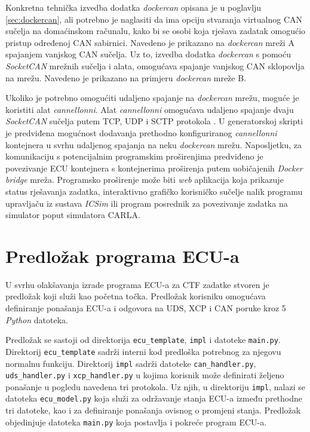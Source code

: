 \documentclass[times, utf8, diplomski, numeric]{fer}
\begin{document}
Konkretna tehnička izvedba dodatka \textit{dockercan} opisana je u poglavlju \ref{sec:dockercan}, ali potrebno je naglasiti da ima opciju stvaranja virtualnog CAN sučelja na domaćinskom računalu, kako bi se osobi koja rješava zadatak omogućio pristup određenoj CAN sabirnici. Navedeno je prikazano na \textit{dockercan} mreži A spajanjem vanjskog CAN sučelja. Uz to, izvedba dodatka \textit{dockercan} s pomoću \textit{SocketCAN} mrežnih sučelja i alata, omogućava spajanje vanjskog CAN sklopovlja na mrežu. Navedeno je prikazano na primjeru \textit{dockercan} mreže B.

Ukoliko je potrebno omogućiti udaljeno spajanje na \textit{dockercan} mrežu, moguće je koristiti alat \textit{cannellonni}. Alat \textit{cannellonni} omogućava udaljeno spajanje dvaju \textit{SocketCAN} sučelja putem TCP, UDP i SCTP protokola \cite{reinhardt2015mapping}. U generatorskoj skripti je predviđena mogućnost dodavanja prethodno konfiguriranog \textit{cannellonni} kontejnera u svrhu udaljenog spajanja na neku \textit{dockercan} mrežu.
\newpage
Naposljetku, za komunikaciju s potencijalnim programskim proširenjima predviđeno je povezivanje ECU kontejnera s kontejnerima proširenja putem uobičajenih \textit{Docker bridge} mreža. Programsko proširenje može biti \textit{web} aplikacija koja prikazuje status rješavanja zadatka, interaktivno grafičko korisničko sučelje nalik programu upravljaču iz sustava \textit{ICSim} ili program posrednik za povezivanje zadatka na simulator poput simulatora CARLA.

\section{Predložak programa ECU-a}
U svrhu olakšavanja izrade programa ECU-a za CTF zadatke stvoren je predložak koji služi kao početna točka. Predložak korisniku omogućava definiranje ponašanja ECU-a i odgovora na UDS, XCP i CAN poruke kroz 5 \textit{Python} datoteka.

Predložak se sastoji od direktorija \texttt{ecu\_template}, \texttt{impl} i datoteke \texttt{main.py}. Direktorij \texttt{ecu\_template} sadrži interni kod predloška potrebnog za njegovu normalnu funkciju. Direktorij \texttt{impl} sadrži datoteke \texttt{can\_handler.py}, \texttt{uds\_handler.py} i \texttt{xcp\_handler.py} u kojima korisnik može definirati željeno ponašanje u pogledu navedena tri protokola. Uz njih, u direktoriju \texttt{impl}, nalazi se datoteka \texttt{ecu\_model.py} koja služi za održavanje stanja ECU-a između prethodne tri datoteke, kao i za definiranje ponašanja ovisnog o promjeni stanja. Predložak objedinjuje datoteka \texttt{main.py} koja postavlja i pokreće program ECU-a.
\end{document}
